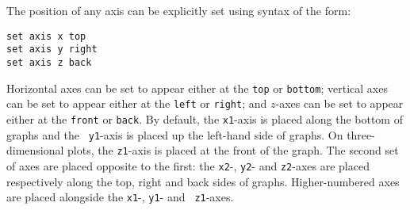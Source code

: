The position of any axis can be explicitly set using syntax of the form:
\begin{verbatim}
set axis x top
set axis y right
set axis z back
\end{verbatim}
Horizontal axes can be set to appear either at the {\tt top} or {\tt bottom};
vertical axes can be set to appear either at the {\tt left} or {\tt right}; and
$z$-axes can be set to appear either at the {\tt front} or {\tt back}.  By
default, the {\tt x1}-axis is placed along the bottom of graphs and the {\tt
y1}-axis is placed up the left-hand side of graphs. On three-dimensional plots,
the {\tt z1}-axis is placed at the front of the graph. The second set of axes
are placed opposite to the first: the {\tt x2}-, {\tt y2}- and {\tt z2}-axes
are placed respectively along the top, right and back sides of graphs.
Higher-numbered axes are placed alongside the {\tt x1}-, {\tt y1}- and {\tt
z1}-axes.

